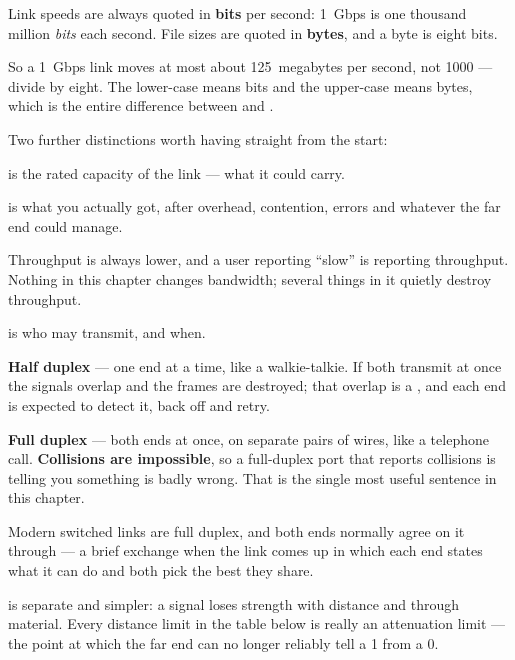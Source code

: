 \begin{definitionbox}
Link speeds are always quoted in \textbf{bits} per second: 1~Gbps is one thousand
million \emph{bits} each second. File sizes are quoted in \textbf{bytes}, and a
byte is eight bits.

So a 1~Gbps link moves at most about 125~megabytes per second, not 1000 --- divide
by eight. The lower-case  means bits and the upper-case  means
bytes, which is the entire difference between  and .

Two further distinctions worth having straight from the start:
\begin{tight}
  \item {} is the rated capacity of the link --- what it could carry.
  \item {} is what you actually got, after overhead, contention,
        errors and whatever the far end could manage.
\end{tight}
Throughput is always lower, and a user reporting ``slow'' is reporting
throughput. Nothing in this chapter changes bandwidth; several things in it
quietly destroy throughput.
\end{definitionbox}

\begin{definitionbox}
 is who may transmit, and when.

\begin{tight}
  \item \textbf{Half duplex} --- one end at a time, like a walkie-talkie. If both
        transmit at once the signals overlap and the frames are destroyed; that
        overlap is a , and each end is expected to detect it,
        back off and retry.
  \item \textbf{Full duplex} --- both ends at once, on separate pairs of wires,
        like a telephone call. \textbf{Collisions are impossible}, so a
        full-duplex port that reports collisions is telling you something is
        badly wrong. That is the single most useful sentence in this chapter.
\end{tight}

Modern switched links are full duplex, and both ends normally agree on it through
 --- a brief exchange when the link comes up in which each
end states what it can do and both pick the best they share.

 is separate and simpler: a signal loses strength with
distance and through material. Every distance limit in the table below is really
an attenuation limit --- the point at which the far end can no longer reliably
tell a 1 from a 0.
\end{definitionbox}

